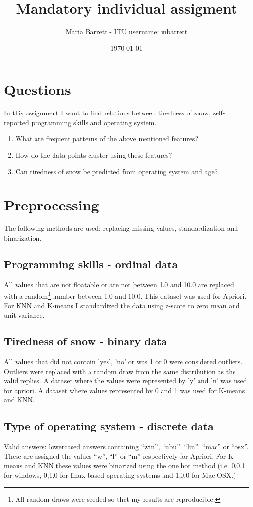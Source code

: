 \documentclass{article}
\title{Mandatory individual assigment}
\author{Maria Barrett - ITU username: mbarrett}
\date{\today}
\begin{document}
\maketitle

\section{Questions}

In this assignment I want to find relations between tiredness of snow, self-reported programming skills and operating system.
\begin{enumerate}
\item What are frequent patterns of the above mentioned features?
\item How do the data points cluster using these features?
\item Can tiredness of snow be predicted from operating system and age?
\end{enumerate}

\section{Preprocessing}
The following methods are used: replacing missing values, standardization and binarization.

\subsection{Programming skills - ordinal data}
All values that are not floatable or are not between 1.0 and 10.0 are replaced with a random\footnote{All random draws were seeded so that my results are reproducible.} number between 1.0 and 10.0. This dataset was used for Apriori. For KNN and K-means I standardized the data using z-score to zero mean and unit variance. 

\subsection{Tiredness of snow - binary data}
All values that did not contain 'yes', 'no' or was 1 or 0 were considered outliers. 
Outliers were replaced with a random draw from the same distribution as the valid replies. 
A dataset where the values were represented by 'y' and 'n' was used for apriori.
A dataset where values represented by 0 and 1 was used for K-means and KNN. 

\subsection{Type of operating system - discrete data}
Valid answers: lowercased answers containing “win”, “ubu”, “lin”, “mac” or “osx”. These are assigned the values “w”, “l” or “m” respectively for Apriori. For K-means and KNN these values were binarized using the one hot method (i.e. 0,0,1 for windows, 0,1,0 for linux-based operating systems and 1,0,0 for Mac OSX.) 
\end{document}
